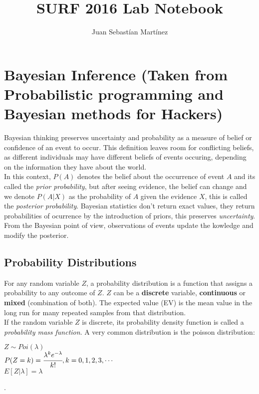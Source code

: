 \documentclass{article}
\title{SURF 2016 Lab Notebook}
\author{Juan Sebastían Martínez}
\date{}
\begin{document}
\maketitle
\hrulefill

\section{Bayesian Inference (Taken from Probabilistic programming and Bayesian methods for Hackers)}

Bayesian thinking preserves uncertainty and probability as a measure of belief or confidence of an event to occur. This definition leaves room for conflicting beliefs, as different individuals may have different beliefs of events occuring, depending on the information they have about the world.\\

In this context, $P(A)$ denotes the belief about the occurrence of event $A$ and its called the \textit{prior probability}, but after seeing evidence, the belief can change and we denote $P(A|X)$ as the probability of $A$ given the evidence $X$, this is called the \textit{posterior probability}. Bayesian statistics don't return exact values, they return probabilities of ocurrence by the introduction of priors, this preserves \textit{uncertainty}. From the Bayesian point of view, observations of events update the kowledge and modify the posterior.\\

\subsection{Probability Distributions}

For any random variable $Z$, a probability distribution is a function that assigns a probability to any outcome of $Z$. $Z$ can be a \textbf{discrete} variable, \textbf{continuous} or \textbf{mixed} (combination of both). The expected value (EV) is the mean value in the long run for many repeated samples from that distribution.\\

If the random variable $Z$ is discrete, its probability density function is called a \textit{probability mass function}. A very common distribution is the poisson distribution:\\

\begin{center}
	$Z \sim Poi(\lambda)$\\
	\vspace{0.2cm}
	$P(Z = k) = \cfrac{\lambda^{k}e^{-\lambda}}{k!}, k = 0,1,2,3,\cdots$\\
	\vspace{0.2cm}
	$E[Z|\lambda] = \lambda$
\end{center}.
\end{document}
